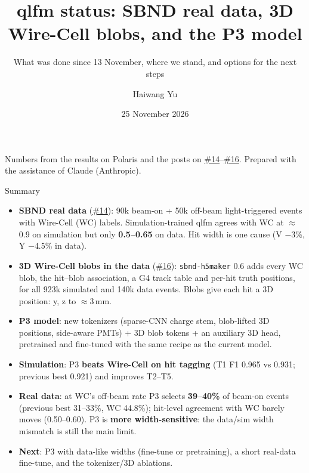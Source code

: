 \documentclass[aspectratio=169,10pt]{beamer}
\title{qlfm status: SBND real data, 3D Wire-Cell blobs, and the P3 model}
\subtitle{What was done since 13 November, where we stand, and options for the next steps}
\author{Haiwang Yu}
\institute{fm4npp-lartpc \;\textbullet\; issues \iss{14} (SBND real data), \iss{15} (3D survey), \iss{16} (P3)}
\date{25 November 2026}
\newcommand{\code}[1]{\texttt{#1}}
\newcommand{\good}[1]{{\color{green!45!black}\textbf{#1}}}
\newcommand{\bad}[1]{{\color{red!70!black}\textbf{#1}}}
\newcommand{\gh}{https://github.com/HaiwangYu/fm4npp-lartpc}
\newcommand{\iss}[1]{\href{\gh/issues/#1}{\color{blue!60!black}\##1}}
\begin{document}
\begin{frame}
  \titlepage
  \vfill
  {\tiny Numbers from the results on Polaris and the posts on \iss{14}--\iss{16}. Prepared with the assistance of Claude (Anthropic).}
\end{frame}

\begin{frame}{Summary}
  \footnotesize
  \begin{itemize}\setlength{\itemsep}{4pt}
    \item \textbf{SBND real data} (\iss{14}): 90k beam-on + 50k off-beam light-triggered events with Wire-Cell (WC) labels. Simulation-trained qlfm
      agrees with WC at $\approx$0.9 on simulation but only \bad{0.5--0.65} on data. Hit width is one cause (V $-$3\%, Y $-$4.5\% in data).
    \item \textbf{3D Wire-Cell blobs in the data} (\iss{16}): \code{sbnd-h5maker} 0.6 adds every WC blob, the hit--blob association, a G4 track table
      and per-hit truth positions, for all 923k simulated and 140k data events. Blobs give each hit a 3D position: y, z to $\approx$3\,mm.
    \item \textbf{P3 model}: new tokenizers (sparse-CNN charge stem, blob-lifted 3D positions, side-aware PMTs) + 3D blob tokens + an auxiliary
      3D head, pretrained and fine-tuned with the same recipe as the current model.
    \item \textbf{Simulation}: P3 \good{beats Wire-Cell on hit tagging} (T1 F1 0.965 vs 0.931; previous best 0.921) and improves T2--T5.
    \item \textbf{Real data}: at WC's off-beam rate P3 selects \good{39--40\%} of beam-on events (previous best 31--33\%, WC 44.8\%);
      hit-level agreement with WC barely moves (0.50--0.60). P3 is \bad{more width-sensitive}: the data/sim width mismatch is still the main limit.
    \item \textbf{Next}: P3 with data-like widths (fine-tune or pretraining), a short real-data fine-tune, and the tokenizer/3D ablations.
  \end{itemize}
\end{frame}
\end{document}
